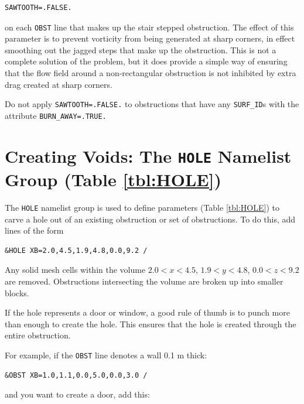\documentclass[11pt]{book}
\newcommand{\ct}{\tt\small}
\begin{document}
\footnotesize
\begin{verbatim}
SAWTOOTH=.FALSE.
\end{verbatim}
\normalsize

\noindent
on each {\ct OBST} line that makes up the stair stepped obstruction.
The effect of this parameter is to prevent vorticity from being generated
at sharp corners, in effect smoothing out the jagged steps that make up
the obstruction. This is not a complete solution of the problem, but it
does provide a simple way of ensuring that the flow field around a
non-rectangular obstruction is not inhibited by extra drag created at
sharp corners.

\begin{warning}
Do not apply {\ct SAWTOOTH=.FALSE.} to obstructions that have any {\ct SURF\_ID}s with the
attribute {\ct BURN\_AWAY=.TRUE.}
\end{warning}




\section{Creating Voids: The \texorpdfstring{{\tt HOLE}}{HOLE} Namelist Group (Table \ref{tbl:HOLE})}
\label{info:HOLE}

The {\ct HOLE} namelist group is used to define parameters (Table \ref{tbl:HOLE}) to carve a hole
out of an existing obstruction or set of obstructions. To do this, add lines of the form

\footnotesize
\begin{verbatim}
&HOLE XB=2.0,4.5,1.9,4.8,0.0,9.2 /
\end{verbatim}
\normalsize
Any solid mesh cells within the volume $2.0<x<4.5$, $1.9<y<4.8$,
$0.0<z<9.2$ are removed. Obstructions intersecting the volume are
broken up into smaller blocks.

\begin{notebox}
\noindent
If the hole represents a door or window, a good rule of thumb is to punch more than enough to create the hole.
This ensures that the hole is created through the entire obstruction.
\end{notebox}

\noindent
For example, if the {\ct OBST} line denotes a wall 0.1 m thick:

\footnotesize
\begin{verbatim}
&OBST XB=1.0,1.1,0.0,5.0,0.0,3.0 /
\end{verbatim}
\normalsize
and you want to create a door, add this:
\end{document}
